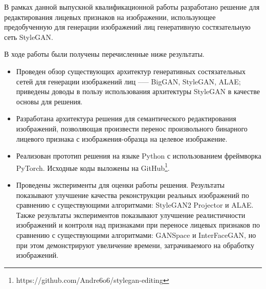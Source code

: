 
В рамках данной выпускной квалификационной работы разработано решение для редактирования лицевых признаков на изображении, использующее предобученную для генерации изображений лиц генеративную состязательную сеть StyleGAN. 

В ходе работы были получены перечисленные ниже результаты.

\begin{itemize}
\item Проведен обзор существующих архитектур генеративных состязательных сетей для генерации изображений лиц --— BigGAN, StyleGAN, ALAE; приведены доводы в пользу использования архитектуры StyleGAN в качестве основы для решения.
\item Разработана архитектура решения для семантического редактирования изображений, позволяющая произвести перенос произвольного бинарного лицевого признака с изображения-образца на целевое изображение.
\item Реализован прототип решения на языке Python с использованием фреймворка PyTorch. Исходные коды выложены на GitHub\footnote{https://github.com/Andre6o6/stylegan-editing}.

\item Проведены эксперименты для оценки работы решения. 
Результаты показывают улучшение качества реконструкции реальных изображений по сравнению с существующими алгоритмами: \linebreak StyleGAN2 Projector и ALAE. 
Также  результаты экспериментов показывают улучшение реалистичности изображений и контроля над признаками при переносе лицевых признаков по сравнению с существующими алгоритмами: GANSpace и InterFaceGAN, но при этом демонстрируют увеличение времени, затрачиваемого на обработку изображений.

\end{itemize}